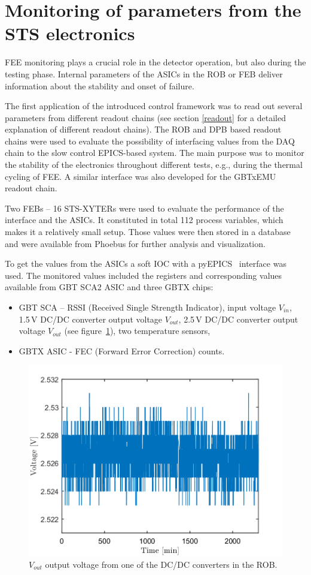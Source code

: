 
\section{Monitoring of parameters from the STS electronics}

\gls{FEE} monitoring plays a crucial role in the detector operation, but also during the testing phase. Internal parameters of the \glspl{ASIC} in the \gls{ROB} or \gls{FEB} deliver information about the stability and onset of failure.


The first application of the introduced control framework was to read out several parameters from different readout chains (see section \ref{readout} for a detailed explanation of different readout chains). The \gls{ROB} and \gls{DPB} based readout chains were used to evaluate the possibility of interfacing values from the \gls{DAQ} chain to the slow control \gls{EPICS}-based system. The main purpose was to monitor the stability of the electronics throughout different tests, e.g., during the thermal cycling of \gls{FEE}. A similar interface was also developed for the GBTxEMU readout chain. 

Two \glspl{FEB} -- 16 STS-XYTERs were used to evaluate the performance of the interface and the ASICs. It constituted in total 112 process variables, which makes it a relatively small setup. Those values were then stored in a database and were available from Phoebus for further analysis and visualization.

To get the values from the \glspl{ASIC} a soft \gls{IOC} with a pyEPICS~\cite{pyEPICS} interface was used. The monitored values included the registers and corresponding values available from \gls{GBT} \gls{SCA2} \gls{ASIC} \cite{GBT_SCA_ASIC} and three GBTX chips: 
\begin{itemize}
    \item GBT SCA -- RSSI (Received Single Strength Indicator), input voltage $V_{in}$, 1.5\,V DC/DC converter output voltage $V_{out}$, 2.5\,V DC/DC converter output voltage $V_{out}$ (see figure~\ref{fig:ROB}), two temperature sensors,
    \item GBTX \gls{ASIC} - FEC (Forward Error Correction) counts.
\end{itemize}

\begin{figure}[!h]
    \centering
    \includegraphics[width=0.65\columnwidth]{Chapter4/images/ROB.png}
    \caption{$V_{out}$ output voltage from one of the DC/DC converters in the \gls{ROB}.}
    \label{fig:ROB}
\end{figure}


